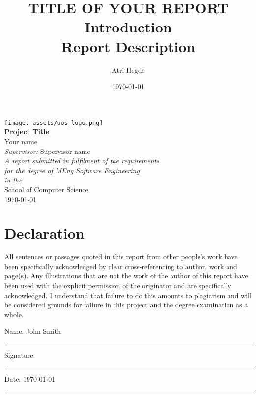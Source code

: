 \documentclass[a4paper,11pt]{report}
\author{Atri Hegde}
\date{\today}
\title{TITLE OF YOUR REPORT Introduction\\\medskip
\large Report Description}
\begin{document}

\begin{titlepage}
\begin{center}
\texttt{[image: assets/uos\_logo.png]}\\[2cm]
\linespread{1.2}\huge {\bfseries Project Title}\\[2cm]
\linespread{1}
{\Large Your name}\\[1cm]
{\large \emph{Supervisor:} Supervisor name}\\[1cm]
\large \emph{A report submitted in fulfilment of the requirements}\\ \emph{for the degree of MEng Software Engineering}\\[0.3cm] \textit{in the}\\[0.3cm] School of Computer Science\\[2cm]
\today
\end{center}
\end{titlepage}


\chapter*{\Large Declaration}

All sentences or passages quoted in this report from other people's work have been specifically acknowledged by clear cross-referencing to author, work and page(s). Any illustrations that are not the work of the author of this report have been used with the explicit permission of the originator and are specifically acknowledged. I understand that failure to do this amounts to plagiarism and will be considered grounds for failure in this project and the degree examination as a whole.

\noindent Name: John Smith \\[1mm]
\rule[1em]{25em}{0.5pt}

\noindent Signature:\\[1mm]
\rule[1em]{25em}{0.5pt}

\noindent Date: \today \\[1mm]
\rule[1em]{25em}{0.5pt}
\end{document}
